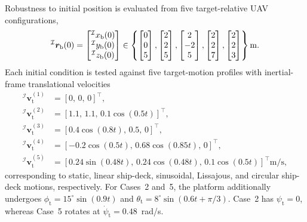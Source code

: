 \documentclass[10pt,conference]{IEEEtran}
\begin{document}
Robustness to initial position is evaluated from five target-relative UAV configurations,
\begin{equation*}
{}^\mathcal{I}\boldsymbol r_\mathrm{b}(0) = 
\begin{bmatrix}
    {}^\mathcal{I}x_\mathrm{b}(0)\\{}^\mathcal{I}y_\mathrm{b}(0)\\{}^\mathcal{I}z_\mathrm{b}(0)
\end{bmatrix}\in
\left\{
\begin{bmatrix} 0\\0\\5\end{bmatrix},
\begin{bmatrix} 2\\2\\5\end{bmatrix},
\begin{bmatrix} 2\\-2\\5\end{bmatrix},
\begin{bmatrix} 2\\2\\7\end{bmatrix},
\begin{bmatrix} 2\\2\\3\end{bmatrix}
\right\} {\rm m}.   
\end{equation*}
Each initial condition is tested against five target-motion profiles with inertial-frame translational velocities
\[
\begin{aligned}
{}^{\mathcal I}\boldsymbol v_{\mathrm t}^{(1)}
    &= [0,\,0,\,0]^\top,\\
{}^{\mathcal I}\boldsymbol v_{\mathrm t}^{(2)}
    &= [1.1,\,1.1,\,0.1\cos(0.5t)]^\top,\\
{}^{\mathcal I}\boldsymbol v_{\mathrm t}^{(3)}
    &= [0.4\cos(0.8t),\,0.5,\,0]^\top,\\
{}^{\mathcal I}\boldsymbol v_{\mathrm t}^{(4)}
    &= [-0.2\cos(0.5t),\,0.68\cos(0.85t),\,0]^\top,\\
{}^{\mathcal I}\boldsymbol v_{\mathrm t}^{(5)}
    &= [0.24\sin(0.48t),\,0.24\cos(0.48t),
        \,0.1\cos(0.5t)]^\top
        \mathrm{m/s},
\end{aligned}
\]
corresponding to static, linear ship-deck, sinusoidal, Lissajous, and
circular ship-deck motions, respectively. For Cases~2 and~5, the
platform additionally undergoes
$\phi_{\mathrm t}=15^\circ\sin(0.9t)$ and
$\theta_{\mathrm t}=8^\circ\sin(0.6t+\pi/3)$.
Case~2 has $\psi_{\mathrm t}=0$, whereas Case~5 rotates at
$\dot\psi_{\mathrm t}=0.48$~rad/s.
\end{document}
